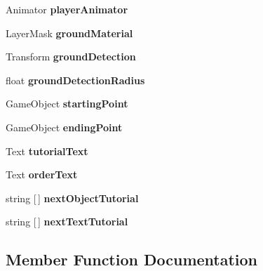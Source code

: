 \begin{DoxyCompactItemize}
Animator {\bfseries player\+Animator}
\item 
\mbox{\label{class_tutorial_controller_a1c134b947e261c4c865ce6b2eef24bc4}} 
Layer\+Mask {\bfseries ground\+Material}
\item 
\mbox{\label{class_tutorial_controller_ab3a5e4452a4ca22b7c1c3401c794f15a}} 
Transform {\bfseries ground\+Detection}
\item 
\mbox{\label{class_tutorial_controller_a985960939d2729d74c7c257affaf5fbf}} 
float {\bfseries ground\+Detection\+Radius}
\item 
\mbox{\label{class_tutorial_controller_aeec904072444bb56c974ac38eb251ac0}} 
Game\+Object {\bfseries starting\+Point}
\item 
\mbox{\label{class_tutorial_controller_a8ac36c568c3144d96eb060c10e539a39}} 
Game\+Object {\bfseries ending\+Point}
\item 
\mbox{\label{class_tutorial_controller_ade48a9e1dbc0cdb1a97d57245dd37f39}} 
Text {\bfseries tutorial\+Text}
\item 
\mbox{\label{class_tutorial_controller_a55dc4a8a032c6f602b912351bede0f3e}} 
Text {\bfseries order\+Text}
\item 
\mbox{\label{class_tutorial_controller_aefd00d6b41766a88262efb738cc32d3d}} 
string \mbox{[}$\,$\mbox{]} {\bfseries next\+Object\+Tutorial}
\item 
\mbox{\label{class_tutorial_controller_a559e44902365c9fe04f220e96e6d0dd4}} 
string \mbox{[}$\,$\mbox{]} {\bfseries next\+Text\+Tutorial}
\end{DoxyCompactItemize}


\subsection{Member Function Documentation}
\mbox{\label{class_tutorial_controller_a25f06b28b2ae32c528f117bf65f752f5}} 
